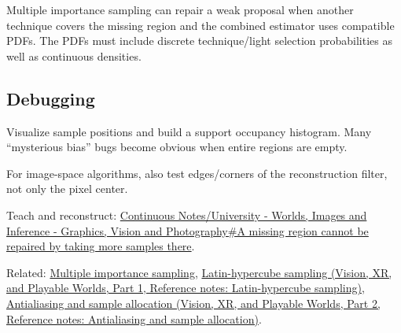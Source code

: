 \hypertarget{appendix-10308c3d753e-mis-support}{}

Multiple importance sampling can repair a weak proposal when another technique covers the missing region and the combined estimator uses compatible PDFs. The PDFs must include discrete technique/light selection probabilities as well as continuous densities.

\subsection{Debugging}\label{appendix-10308c3d753e-debugging}

\hypertarget{appendix-10308c3d753e-debugging}{}

Visualize sample positions and build a support occupancy histogram. Many ``mysterious bias'' bugs become obvious when entire regions are empty.

For image-space algorithms, also test edges/corners of the reconstruction filter, not only the pixel center.

Teach and reconstruct: \hyperref[03-visual-computing-i-ch007-a-missing-region-cannot-be-repaired-by-taking-more-samples-there]{Continuous Notes/University - Worlds, Images and Inference - Graphics, Vision and Photography\#A missing region cannot be repaired by taking more samples there}.

Related: \hyperref[appendix-ca8898faf1a6]{Multiple importance sampling}, \href{../07-Vision-XR-and-Playable-Worlds-P01/main.pdf\#nameddest=appendix-1c5e85693a06}{Latin-hypercube sampling (Vision, XR, and Playable Worlds, Part 1, Reference notes: Latin-hypercube sampling)}, \href{../07-Vision-XR-and-Playable-Worlds-P02/main.pdf\#nameddest=appendix-4192b2bdd21e}{Antialiasing and sample allocation (Vision, XR, and Playable Worlds, Part 2, Reference notes: Antialiasing and sample allocation)}.
